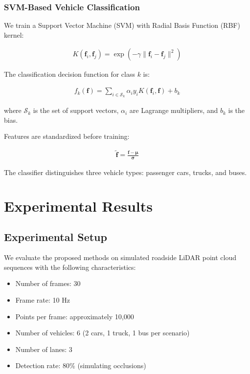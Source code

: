 \documentclass[numbered]{trbunofficial}
\begin{document}
\subsubsection{SVM-Based Vehicle Classification}

We train a Support Vector Machine (SVM) with Radial Basis Function (RBF) kernel:

\begin{align}
  K(\mathbf{f}_i, \mathbf{f}_j) = \exp\left(-\gamma \|\mathbf{f}_i - \mathbf{f}_j\|^2\right)
\end{align}

The classification decision function for class $k$ is:

\begin{align}
  f_k(\mathbf{f}) = \sum_{i \in \mathcal{S}_k} \alpha_i y_i K(\mathbf{f}_i, \mathbf{f}) + b_k
\end{align}

where $\mathcal{S}_k$ is the set of support vectors, $\alpha_i$ are Lagrange multipliers, and $b_k$ is the bias.

Features are standardized before training:

\begin{align}
  \tilde{\mathbf{f}} = \frac{\mathbf{f} - \boldsymbol{\mu}}{\boldsymbol{\sigma}}
\end{align}

The classifier distinguishes three vehicle types: passenger cars, trucks, and buses.


\section{Experimental Results}

\subsection{Experimental Setup}

We evaluate the proposed methods on simulated roadside LiDAR point cloud sequences with the following characteristics:
\begin{itemize}
  \item Number of frames: 30
  \item Frame rate: 10 Hz
  \item Points per frame: approximately 10,000
  \item Number of vehicles: 6 (2 cars, 1 truck, 1 bus per scenario)
  \item Number of lanes: 3
  \item Detection rate: 80\% (simulating occlusions)
\end{itemize}
\end{document}

